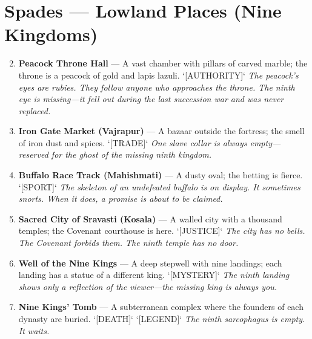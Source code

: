 \section*{Spades --- Lowland Places (Nine Kingdoms)}
\label{sec:dhahara-lowland-places}
\begin{enumerate}
\setcounter{enumi}{1}
\item \textbf{Peacock Throne Hall} --- A vast chamber with pillars of carved marble; the throne is a peacock of gold and lapis lazuli. `[AUTHORITY]`
  \hfill \textit{The peacock's eyes are rubies. They follow anyone who approaches the throne. The ninth eye is missing---it fell out during the last succession war and was never replaced.}
\item \textbf{Iron Gate Market (Vajrapur)} --- A bazaar outside the fortress; the smell of iron dust and spices. `[TRADE]`
  \hfill \textit{One slave collar is always empty---reserved for the ghost of the missing ninth kingdom.}
\item \textbf{Buffalo Race Track (Mahishmati)} --- A dusty oval; the betting is fierce. `[SPORT]`
  \hfill \textit{The skeleton of an undefeated buffalo is on display. It sometimes snorts. When it does, a promise is about to be claimed.}
\item \textbf{Sacred City of Sravasti (Kosala)} --- A walled city with a thousand temples; the Covenant courthouse is here. `[JUSTICE]`
  \hfill \textit{The city has no bells. The Covenant forbids them. The ninth temple has no door.}
\item \textbf{Well of the Nine Kings} --- A deep stepwell with nine landings; each landing has a statue of a different king. `[MYSTERY]`
  \hfill \textit{The ninth landing shows only a reflection of the viewer---the missing king is always you.}
\item \textbf{Nine Kings' Tomb} --- A subterranean complex where the founders of each dynasty are buried. `[DEATH]` `[LEGEND]`
  \hfill \textit{The ninth sarcophagus is empty. It waits.}
\end{enumerate}

